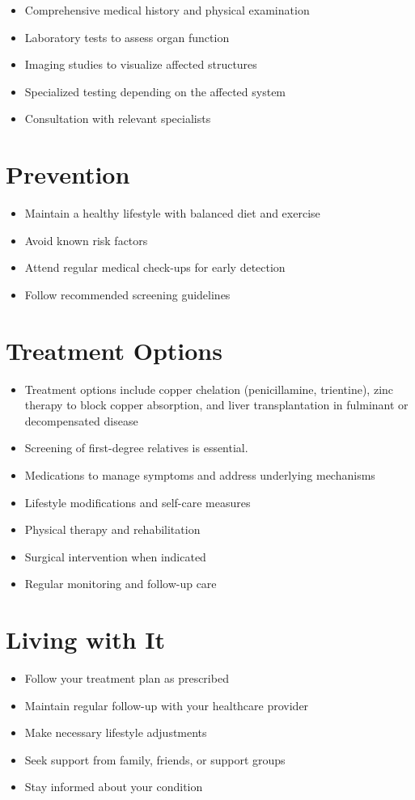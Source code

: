 \begin{itemize}[noitemsep]
  \item Comprehensive medical history and physical examination
  \item Laboratory tests to assess organ function
  \item Imaging studies to visualize affected structures
  \item Specialized testing depending on the affected system
  \item Consultation with relevant specialists
\end{itemize}
\section{Prevention}
\begin{itemize}[noitemsep]
  \item Maintain a healthy lifestyle with balanced diet and exercise
  \item Avoid known risk factors
  \item Attend regular medical check-ups for early detection
  \item Follow recommended screening guidelines
\end{itemize}
\section{Treatment Options}
\begin{itemize}[noitemsep]
  \item Treatment options include copper chelation (penicillamine, trientine), zinc therapy to block copper absorption, and liver transplantation in fulminant or decompensated disease
  \item Screening of first-degree relatives is essential.
  \item Medications to manage symptoms and address underlying mechanisms
  \item Lifestyle modifications and self-care measures
  \item Physical therapy and rehabilitation
  \item Surgical intervention when indicated
  \item Regular monitoring and follow-up care
\end{itemize}
\section{Living with It}
\begin{itemize}[noitemsep]
  \item Follow your treatment plan as prescribed
  \item Maintain regular follow-up with your healthcare provider
  \item Make necessary lifestyle adjustments
  \item Seek support from family, friends, or support groups
  \item Stay informed about your condition
\end{itemize}
